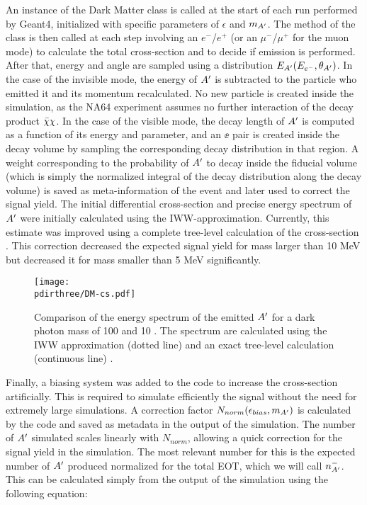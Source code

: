 An instance of the Dark Matter class is called at the start of each run performed by Geant4, initialized with specific parameters of $\epsilon$ and $m_{A'}$. The method of the class is then called at each step involving an $e^-$/$e^+$ (or an $\mu^-$/$\mu^+$ for the muon mode) to calculate the total cross-section and to decide if emission is performed. After that, energy and angle are sampled using a distribution $E_{A'}(E_{e^-}, \theta_{A'})$. In the case of the invisible mode, the energy of $A'$ is subtracted to the particle who emitted it and its momentum recalculated. No new particle is created inside the simulation, as the NA64 experiment assumes no further interaction of the decay product $\bar{\chi} \chi$. In the case of the visible mode, the decay length of $A'$ is computed as a function of its energy and parameter, and an $\ee$ pair is created inside the decay volume by sampling the corresponding decay distribution in that region. A weight corresponding to the probability of $A'$ to decay inside the fiducial volume (which is simply the normalized integral of the decay distribution along the decay volume) is saved as meta-information of the event and later used to correct the signal yield.
The initial differential cross-section and precise energy spectrum of $A'$ were initially calculated using the IWW-approximation. Currently, this estimate was improved using a complete tree-level calculation of the cross-section \cite{DMsimulation}. This correction decreased the expected signal yield for mass larger than 10 MeV but decreased it for mass smaller than 5 MeV significantly.

\begin{figure}[htb!]
  \centering
  \texttt{[image: \\pdirthree/DM-cs.pdf]}
  \caption[IWW vs tree-level energy spectra]{Comparison of the energy spectrum of the emitted $A'$ for a dark photon mass of 100 \mev and 10 \mev. The spectrum are calculated using the IWW approximation (dotted line) and an exact tree-level calculation (continuous line) \cite{DMsimulation}.}
  \label{fig:dm-iww-tl}
\end{figure}


Finally, a biasing system was added to the code to increase the cross-section artificially. This is required to simulate efficiently the signal without the need for extremely large simulations. A correction factor $N_{norm}(\epsilon_{bias},m_{A'})$ is calculated by the code and saved as metadata in the output of the simulation. The number of $A'$ simulated scales linearly with $N_{norm}$, allowing a quick correction for the signal yield in the simulation. The most relevant number for this is the expected number of $A'$ produced normalized for the total EOT, which we will call $n^-_{A'}$. This can be calculated simply from the output of the simulation using the following equation:


